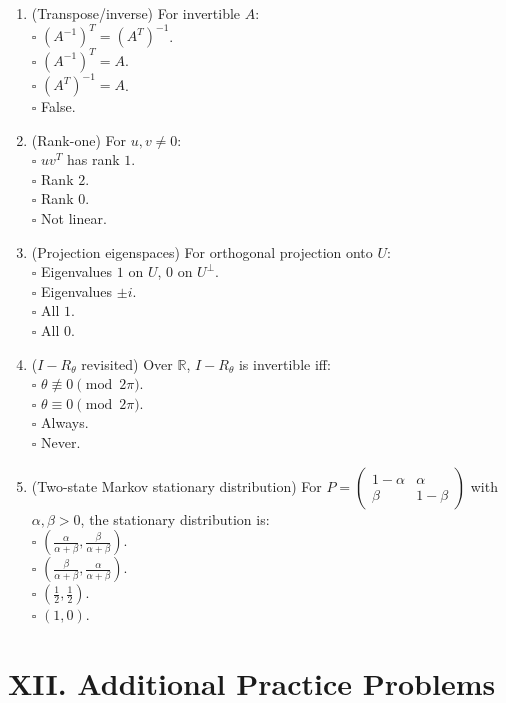 \documentclass[11pt]{article}
\begin{document}
\begin{enumerate}
\item (Transpose/inverse) For invertible $A$:\\
\(\square\) $(A^{-1})^T=(A^T)^{-1}$.\\
\(\square\) $(A^{-1})^T=A$.\\
\(\square\) $(A^T)^{-1}=A$.\\
\(\square\) False.

\item (Rank-one) For $u,v\neq 0$:\\
\(\square\) $uv^T$ has rank $1$.\\
\(\square\) Rank $2$.\\
\(\square\) Rank $0$.\\
\(\square\) Not linear.

\item (Projection eigenspaces) For orthogonal projection onto $U$:\\
\(\square\) Eigenvalues $1$ on $U$, $0$ on $U^\perp$.\\
\(\square\) Eigenvalues $\pm i$.\\
\(\square\) All $1$.\\
\(\square\) All $0$.

\item ($I-R_\theta$ revisited) Over $\mathbb{R}$, $I-R_\theta$ is invertible iff:\\
\(\square\) $\theta\not\equiv 0\pmod{2\pi}$.\\
\(\square\) $\theta\equiv 0\pmod{2\pi}$.\\
\(\square\) Always.\\
\(\square\) Never.

\item (Two-state Markov stationary distribution) For
$P=\begin{pmatrix}1-\alpha&\alpha\\ \beta&1-\beta\end{pmatrix}$ with $\alpha,\beta>0$, the stationary distribution is:\\
\(\square\) $\left(\frac{\alpha}{\alpha+\beta},\frac{\beta}{\alpha+\beta}\right)$.\\
\(\square\) $\left(\frac{\beta}{\alpha+\beta},\frac{\alpha}{\alpha+\beta}\right)$.\\
\(\square\) $(\tfrac12,\tfrac12)$.\\
\(\square\) $(1,0)$.
\end{enumerate}
\section*{XII. Additional Practice Problems}
\end{document}
